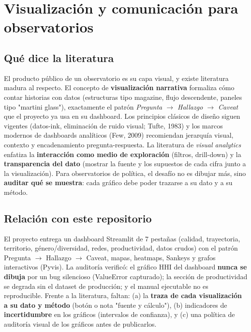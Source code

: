 \section{Visualización y comunicación para observatorios}

\subsection{Qué dice la literatura}

El producto público de un observatorio es su capa visual, y existe literatura
madura al respecto. El concepto de \textbf{visualización narrativa}
\citep{segel2010narrative} formaliza cómo contar historias con datos
(estructuras tipo magazine, flujo descendente, paneles tipo "martini glass"),
exactamente el patrón \emph{Pregunta $\rightarrow$ Hallazgo $\rightarrow$ Caveat}
que el proyecto ya usa en su dashboard. Los principios clásicos de diseño
siguen vigentes (datos-ink, eliminación de ruido visual; Tufte, 1983) y los
marcos modernos de dashboards analíticos (Few, 2009) recomiendan jerarquía
visual, contexto y encadenamiento pregunta-respuesta. La literatura de
\emph{visual analytics} enfatiza la \textbf{interacción como medio de
exploración} (filtros, drill-down) y la \textbf{transparencia del dato}
(mostrar la fuente y los supuestos de cada cifra junto a la visualización).
Para observatorios de política, el desafío no es dibujar más, sino
\textbf{auditar qué se muestra}: cada gráfico debe poder trazarse a su dato y a
su método.

\subsection{Relación con este repositorio}

El proyecto entrega un dashboard Streamlit de 7 pestañas (calidad, trayectoria,
territorio, género/diversidad, redes, productividad, datos crudos) con el
patrón Pregunta $\rightarrow$ Hallazgo $\rightarrow$ Caveat, mapas, heatmaps,
Sankeys y grafos interactivos (Pyvis). La auditoría verificó: el gráfico HHI
del dashboard \textbf{nunca se dibuja} por un bug silencioso (ValueError
capturado); la sección de productividad se degrada sin el dataset de
producción; y el manual ejecutable no es reproducible. Frente a la literatura,
faltan: (a) la \textbf{traza de cada visualización a su dato y método} (botón o
nota "fuente y cálculo"), (b) indicadores de \textbf{incertidumbre} en los
gráficos (intervalos de confianza), y (c) una política de auditoría visual de
los gráficos antes de publicarlos.

